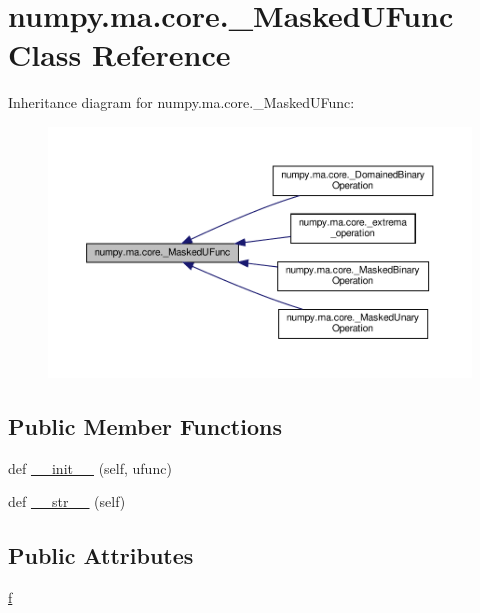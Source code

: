 \hypertarget{classnumpy_1_1ma_1_1core_1_1__MaskedUFunc}{}\section{numpy.\+ma.\+core.\+\_\+\+Masked\+U\+Func Class Reference}
\label{classnumpy_1_1ma_1_1core_1_1__MaskedUFunc}


Inheritance diagram for numpy.\+ma.\+core.\+\_\+\+Masked\+U\+Func\+:
\nopagebreak
\begin{figure}[H]
\begin{center}
\leavevmode
\includegraphics[width=350pt]{classnumpy_1_1ma_1_1core_1_1__MaskedUFunc__inherit__graph}
\end{center}
\end{figure}
\subsection*{Public Member Functions}
\begin{DoxyCompactItemize}
\item 
def \hyperlink{classnumpy_1_1ma_1_1core_1_1__MaskedUFunc_ac1c77f6c0967911b68c928d2164af3bb}{\+\_\+\+\_\+init\+\_\+\+\_\+} (self, ufunc)
\item 
def \hyperlink{classnumpy_1_1ma_1_1core_1_1__MaskedUFunc_a3e104c6fa551b0540dfbcab92041c131}{\+\_\+\+\_\+str\+\_\+\+\_\+} (self)
\end{DoxyCompactItemize}
\subsection*{Public Attributes}
\begin{DoxyCompactItemize}
\item 
\hyperlink{classnumpy_1_1ma_1_1core_1_1__MaskedUFunc_a5c846abb4468646636e37165b9ba33ac}{f}
\end{DoxyCompactItemize}


